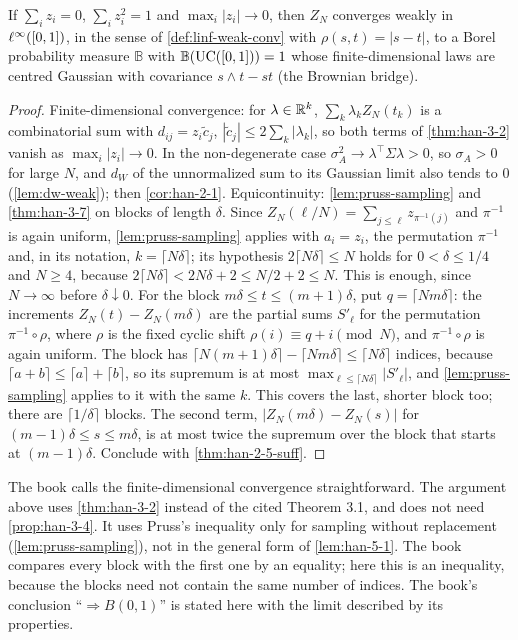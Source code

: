 \begin{theorem}
  \label{thm:han-5-1}
  If $\sum_iz_i=0$, $\sum_iz_i^2=1$ and $\max_i|z_i|\to0$, then $Z_N$ converges weakly in $\ell^\infty([0,1])$, in the sense of \cref{def:linf-weak-conv} with $\rho(s,t)=|s-t|$, to a Borel probability measure $\mathbb B$ with $\mathbb B(\mathrm{UC}([0,1]))=1$ whose finite-dimensional laws are centred Gaussian with covariance $s\wedge t-st$ (the Brownian bridge).
\end{theorem}
\begin{proof}
  Finite-dimensional convergence: for $\lambda\in\mathbb{R}^k$, $\sum_k\lambda_kZ_N(t_k)$ is a combinatorial sum with $d_{ij}=z_i\tilde c_j$, $|\tilde c_j|\le2\sum_k|\lambda_k|$, so both terms of \cref{thm:han-3-2} vanish as $\max_i|z_i|\to0$. In the non-degenerate case $\sigma_A^2\to\lambda^\top\Sigma\lambda>0$, so $\sigma_A>0$ for large $N$, and $d_W$ of the unnormalized sum to its Gaussian limit also tends to $0$ (\cref{lem:dw-weak}); then \cref{cor:han-2-1}. Equicontinuity: \cref{lem:pruss-sampling} and \cref{thm:han-3-7} on blocks of length $\delta$. Since $Z_N(\ell/N)=\sum_{j\le\ell}z_{\pi^{-1}(j)}$ and $\pi^{-1}$ is again uniform, \cref{lem:pruss-sampling} applies with $a_i=z_i$, the permutation $\pi^{-1}$ and, in its notation, $k=\lceil N\delta\rceil$; its hypothesis $2\lceil N\delta\rceil\le N$ holds for $0<\delta\le1/4$ and $N\ge4$, because $2\lceil N\delta\rceil<2N\delta+2\le N/2+2\le N$. This is enough, since $N\to\infty$ before $\delta\downarrow0$. For the block $m\delta\le t\le(m+1)\delta$, put $q=\lceil Nm\delta\rceil$: the increments $Z_N(t)-Z_N(m\delta)$ are the partial sums $S'_\ell$ for the permutation $\pi^{-1}\circ\rho$, where $\rho$ is the fixed cyclic shift $\rho(i)\equiv q+i\pmod N$, and $\pi^{-1}\circ\rho$ is again uniform. The block has $\lceil N(m+1)\delta\rceil-\lceil Nm\delta\rceil\le\lceil N\delta\rceil$ indices, because $\lceil a+b\rceil\le\lceil a\rceil+\lceil b\rceil$, so its supremum is at most $\max_{\ell\le\lceil N\delta\rceil}|S'_\ell|$, and \cref{lem:pruss-sampling} applies to it with the same $k$. This covers the last, shorter block too; there are $\lceil1/\delta\rceil$ blocks. The second term, $|Z_N(m\delta)-Z_N(s)|$ for $(m-1)\delta\le s\le m\delta$, is at most twice the supremum over the block that starts at $(m-1)\delta$. Conclude with \cref{thm:han-2-5-suff}.
\end{proof}
\begin{remark}
  The book calls the finite-dimensional convergence straightforward. The argument above uses \cref{thm:han-3-2} instead of the cited Theorem 3.1, and does not need \cref{prop:han-3-4}. It uses Pruss's inequality only for sampling without replacement (\cref{lem:pruss-sampling}), not in the general form of \cref{lem:han-5-1}. The book compares every block with the first one by an equality; here this is an inequality, because the blocks need not contain the same number of indices. The book's conclusion ``$\Rightarrow B(0,1)$'' is stated here with the limit described by its properties.
\end{remark}

